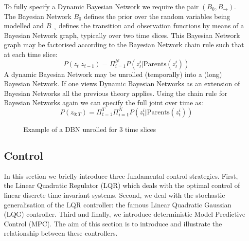 To fully specify a Dynamic Bayesian Network we require the pair $(B_0, B_{\rightarrow})$. The Bayesian Network $B_0$ defines the prior over the random variables being modelled and $B_{\rightarrow}$ defines the transition and observation functions by means of a Bayesian Network graph, typically over two time slices. This Bayesian Network graph may be factorised according to the Bayesian Network chain rule such that at each time slice:
\begin{equation}
P(z_t|z_{t-1}) = \Pi_{i=1}^{N}P(z_t^i| \text{Parents} (z^i_t))
\end{equation}
A dynamic Bayesian Network may be unrolled (temporally) into a (long) Bayesian Network. If one views Dynamic Bayesian Networks as an extension of Bayesian Networks all the previous theory applies. Using the chain rule for Bayesian Networks again we can specify the full joint over time as:
\begin{equation}
P(z_{0:T}) = \Pi_{t=1}^{T}\Pi_{i=1}^{N}P(z_t^i| \text{Parents} (z^i_t))
\end{equation}
\begin{figure}[H] 
\centering
{}
\caption{Example of a DBN unrolled for 3 time slices}
\label{fig_gen_dbn}
\end{figure}
\subsection{Control}
\label{sec_lit_control}
In this section we briefly introduce three fundamental control strategies. First, the Linear Quadratic Regulator (LQR) which deals with the optimal control of linear discrete time invariant systems. Second, we deal with the stochastic generalisation of the LQR controller: the famous Linear Quadratic Gaussian (LQG) controller. Third and finally, we introduce deterministic Model Predictive Control (MPC). The aim of this section is to introduce and illustrate the relationship between these controllers.

